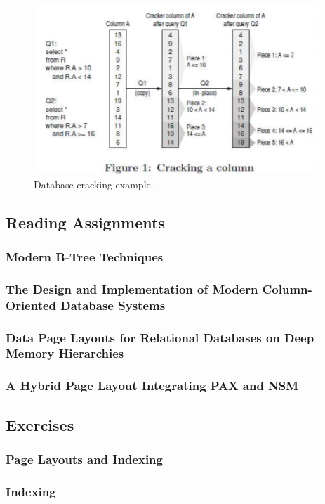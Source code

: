 \begin{figure}[h]
	\centering
	\includegraphics[scale=0.8]{images/2-crack.PNG}
	\caption{Database cracking example.}
	\label{fig:crack}
\end{figure}


\subsection{Reading Assignments}

\subsubsection{Modern B-Tree Techniques}

\subsubsection{The Design and Implementation of Modern Column-Oriented Database Systems}

\subsubsection{Data Page Layouts for Relational Databases on Deep Memory Hierarchies}

\subsubsection{A Hybrid Page Layout Integrating PAX and NSM}

\subsection{Exercises}

\subsubsection{Page Layouts and Indexing}

\subsubsection{Indexing}